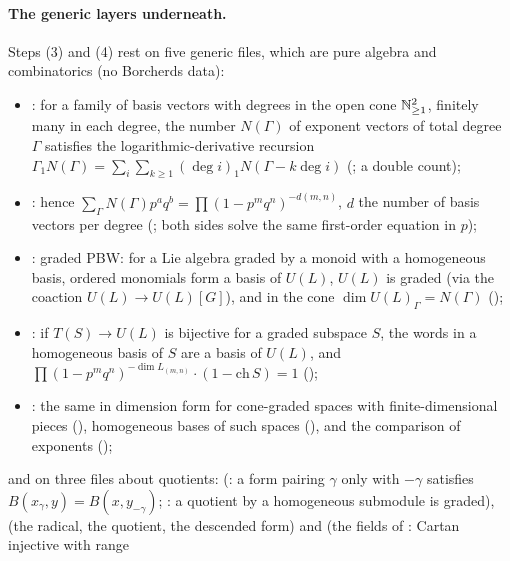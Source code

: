 \paragraph{The generic layers underneath.}  Steps (3) and (4) rest on five generic files, which are pure algebra and
combinatorics (no Borcherds data):
\begin{itemize}
\item {}: for a family of basis vectors with degrees in the open cone ${\mathbb{N}}_{\ge1}^2$,
  finitely many in each degree, the number $N(\Gamma)$ of exponent vectors of total degree $\Gamma$ satisfies the
  logarithmic-derivative recursion $\Gamma_1N(\Gamma)=\sum_i\sum_{k\ge1}(\deg i)_1N(\Gamma-k\deg i)$ (; a
  double count);
\item {}: hence $\sum_\Gamma N(\Gamma)p^aq^b=\prod(1-p^mq^n)^{-d(m,n)}$, $d$ the number of
  basis vectors per degree (; both sides solve the same first-order equation in $p$);
\item {}: graded PBW: for a Lie algebra graded by a monoid with a homogeneous basis,
  ordered monomials form a basis of $U(L)$, $U(L)$ is graded (via the coaction $U(L)\to U(L)[G]$), and in the cone
  $\dim U(L)_\Gamma=N(\Gamma)$ ();
\item {}: if $T(S)\to U(L)$ is bijective for a graded subspace $S$, the words in a
  homogeneous basis of $S$ are a basis of $U(L)$, and
  $\prod(1-p^mq^n)^{-\dim L_{(m,n)}}\cdot(1-\mathrm{ch}\,S)=1$ ();
\item {}: the same in dimension form for cone-graded spaces with finite-dimensional
  pieces (), homogeneous bases of such spaces (), and
  the comparison of exponents ();
\end{itemize}
and on three files about quotients:  (: a form pairing
$\gamma$ only with $-\gamma$ satisfies $B(x_\gamma,y)=B(x,y_{-\gamma})$; : a quotient by a homogeneous submodule is
graded),  (the radical, the quotient, the descended form) and
 (the fields of : Cartan injective with range
